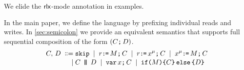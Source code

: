 We elide the ${\mathsf{rlx}}$-mode annotation in examples.
\begin{comment}
\footnote{We only consider executions where register state is empty in
  forked threads.  Given item~\ref{pre-acquire} of
  Definition~\ref{def:prefix}, a sufficient condition is that parallel
  composition is always preceded by an acquire fence, as in programs of the
  form:
  \begin{displaymath}
    \VAR\vec{\aLoc}\SEMI
    \vec{\aLoc}\GETS\vec{0}\SEMI
    \vec{\bLoc}\GETS\vec{0}\SEMI
    \FENCE\SEMI
    (\aCmd^1 \PAR \cdots \PAR \aCmd^n)
  \end{displaymath}
  where $\aCmd^1$, \ldots, $\aCmd^n$ do not include $\PAR$.  To avoid clutter
  in drawings, we often drop the explicit fence.}.
\end{comment}

In the main paper, we define the language by prefixing individual reads and writes.  In
\textsection\ref{sec:semicolon} we provide an equivalent semantics that supports
full sequential composition of the form $(C\texttt{;}\,\allowbreak D)$.
\begin{align*}
C,\,D
\;\mathrel{\mathord{\vcentcolon}\mkern-1mu\mathord{\vcentcolon}\mathord{{=}}}\;& \texttt{skip}
\;\mathrel{|}\; r\texttt{:}\mkern-1mu\texttt{=}\,M\texttt{;}\,\allowbreak C
\;\mathrel{|}\; r\texttt{:}\mkern-1mu\texttt{=}\,x^{\mu}\texttt{;}\,\allowbreak C 
\;\mathrel{|}\; x^{\mu}\texttt{:}\mkern-1mu\texttt{=}\,M\texttt{;}\,\allowbreak C
\\[-.5ex]
\;\mathrel{|}\;&C \,\mathbin{\texttt{\textbf{|}}\mkern-6mu\texttt{\textbf{|}}}\, D
\;\mathrel{|}\; \texttt{var}\,x\texttt{;}\,\allowbreak C
\;\mathrel{|}\; \texttt{if}\allowbreak\texttt{(}M\texttt{)} \allowbreak\texttt{\{} C \texttt{\}}\,\allowbreak\texttt{else}\allowbreak\,\texttt{\{} D \texttt{\}}
\end{align*}




